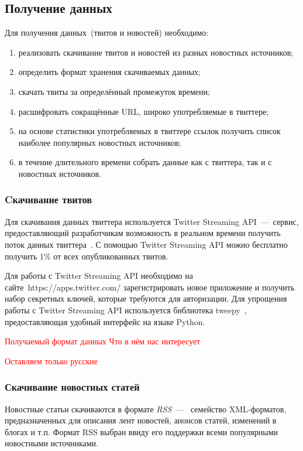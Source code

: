 \subsection{Получение данных}
    Для получения данных~(твитов и новостей) необходимо:
    \begin{enumerate}
        \item реализовать скачивание твитов и новостей из разных новостных источников;
        \item определить формат хранения скачиваемых данных;
        \item скачать твиты за определённый промежуток времени;
        \item расшифровать сокращённые URL, широко употребляемые в твиттере;
        \item на основе статистики употребляемых в твиттере ссылок получить список наиболее популярных новостных источников;
        \item в течение длительного времени собрать данные как с твиттера, так и с новостных источников.
    \end{enumerate}

    \subsubsection{Cкачивание твитов}
        Для скачивания данных твиттера используется Twitter Streaming API~---~сервис,
        предоставляющий разработчикам возможность в реальном времени получить поток данных твиттера~\cite{twitter_streaming}.
        С помощью Twitter Streaming API можно бесплатно получить 1\% от всех опубликованных твитов.

        Для работы с Twitter Streaming API необходимо на сайте~https://apps.twitter.com/ зарегистрировать новое приложение и получить набор секретных ключей,
        которые требуются для авторизации.
        Для упрощения работы с Twitter Streaming API используется библиотека tweepy~\cite{tweepy}, предоставляющая удобный интерфейс на языке Python.

        \textcolor{red}{Получаемый формат данных}
        \textcolor{red}{Что в нём нас интересует}

        \textcolor{red}{Оставляем только русские}

    \subsubsection{Скачивание новостных статей}
        Новостные статьи скачиваются в формате
        \textit{RSS}~---~ семейство XML-форматов, предназначенных для описания лент новостей, анонсов статей, изменений в блогах и т.п.
        Формат RSS выбран ввиду его поддержки всеми популярными новостными источниками.

